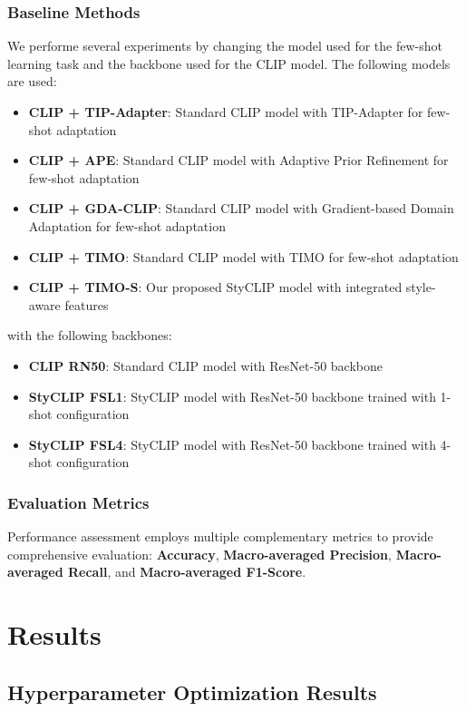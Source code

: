 \documentclass[conference,6pt]{IEEEtran}
\begin{document}
\subsubsection{Baseline Methods}

We performe several experiments by changing the model used for the few-shot learning task and the backbone used for the CLIP model. The following models are used:
\begin{itemize}
    \item \textbf{CLIP + TIP-Adapter}: Standard CLIP model with TIP-Adapter \cite{TipAdapter} for few-shot adaptation
    \item \textbf{CLIP + APE}: Standard CLIP model with Adaptive Prior Refinement \cite{APE} for few-shot adaptation
    \item \textbf{CLIP + GDA-CLIP}: Standard CLIP model with Gradient-based Domain Adaptation \cite{GDA_CLIP} for few-shot adaptation
    \item \textbf{CLIP + TIMO}: Standard CLIP model with TIMO \cite{TIMO} for few-shot adaptation
    \item \textbf{CLIP + TIMO-S}: Our proposed StyCLIP model with integrated style-aware features
\end{itemize}

with the following backbones:
\begin{itemize}
    \item \textbf{CLIP RN50}: Standard CLIP model with ResNet-50 backbone
    \item \textbf{StyCLIP FSL1}: StyCLIP model with ResNet-50 backbone trained with 1-shot configuration
    \item \textbf{StyCLIP FSL4}: StyCLIP model with ResNet-50 backbone trained with 4-shot configuration
\end{itemize}

\subsubsection{Evaluation Metrics}

Performance assessment employs multiple complementary metrics to provide comprehensive evaluation: \textbf{Accuracy}, \textbf{Macro-averaged Precision}, \textbf{Macro-averaged Recall}, and \textbf{Macro-averaged F1-Score}. 

\section{Results}
\subsection{Hyperparameter Optimization Results}
\end{document}

